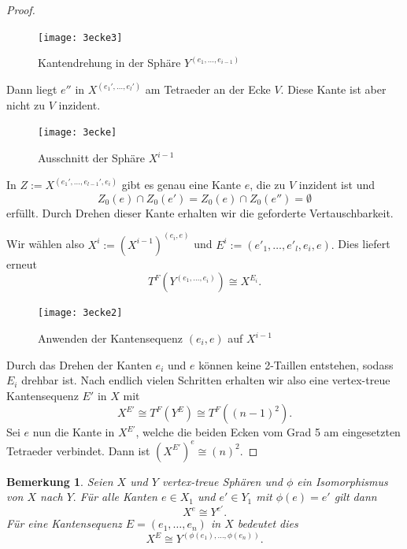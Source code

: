 \documentclass[12pt,titlepage,twoside,cleardoublepage]{article}
\theoremstyle{nummermitklammern}
\newtheorem{bemerkung}[temp]{Bemerkung}
\newtheorem{bemerkung}[zahl]{Bemerkung}
\numberwithin{equation}{section}
\begin{document}
\begin{proof}
\begin{itemize}
\begin{figure}[H]
\begin{center}
\texttt{[image: 3ecke3]}
\end{center}
\caption{Kantendrehung in der Sphäre $Y^{(e_1,\ldots,e_{i-1})}$}
\end{figure}
Dann liegt $e''$ in $X^{(e_1',\ldots,e_l')}$ am Tetraeder an der Ecke $V.$ Diese Kante ist aber nicht zu $V$ inzident.  
\begin{figure}[H]
\begin{center}
\texttt{[image: 3ecke]}
\end{center}
\caption{Ausschnitt der Sphäre $X^{i-1}$}
\end{figure}
In $Z:=X^{(e_1',\ldots,e_{l-1}',e_i)}$ gibt es genau eine Kante $e$, die zu $V$ inzident ist und 
 \[
Z_0(e)\cap Z_0(e')=Z_0(e)\cap Z_0(e'')=\emptyset
\]
erfüllt. Durch Drehen dieser Kante erhalten wir die geforderte Vertauschbarkeit.

Wir wählen also $X^{i}:={(X^{i-1})}^{(e_i,e)}$ und $E^{i}:=(e'_1,\ldots,e'_l,e_i,e).$ Dies liefert erneut
\[
T^F(Y^{(e_1,\ldots,e_i)})\cong X^{E_{i}}.
\] 
\begin{figure}[H]
\begin{center}
\texttt{[image: 3ecke2]}
\end{center}
\caption{Anwenden der Kantensequenz $(e_i,e)$ auf $X^{i-1}$}
\end{figure}
\end{itemize}
 Durch das Drehen der Kanten $e_i$ und $e$ können keine 2-Taillen entstehen, sodass $E_{i}$ drehbar ist.
Nach endlich vielen Schritten erhalten wir also eine vertex-treue Kantensequenz $E'$ in $X$ mit
\[X^{E'}\cong T^F(Y^E) \cong T^F((n-1)^2).
\]
Sei $e$ nun die Kante in $X^{E'}$, welche die beiden Ecken vom Grad 5 am eingesetzten Tetraeder verbindet. Dann ist $(X^{E'})^e\cong (n)^2.$
\end{proof}
\begin{bemerkung}
Seien $X$ und $Y$ vertex-treue Sphären und $\phi$ ein Isomorphismus von $X$ nach $Y.$ Für alle Kanten $e\in X_1$ und $e'\in Y_1$ mit $\phi(e)=e'$ gilt dann
\[ 
X^e \cong Y^{e'} .
\]
Für eine Kantensequenz $E=(e_1,\ldots,e_n)$ in $X$ bedeutet dies 
\[
X^E\cong Y^{(\phi(e_1),\ldots,\phi(e_n))}.
\]
\end{bemerkung}
\end{document}
